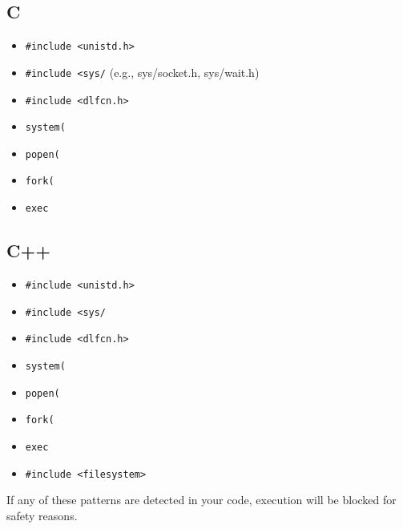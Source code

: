 \documentclass{article}
\begin{document}
\subsection*{C}
\begin{itemize}
    \item \texttt{\#include <unistd.h>}
    \item \texttt{\#include <sys/} (e.g., sys/socket.h, sys/wait.h)
    \item \texttt{\#include <dlfcn.h>}
    \item \texttt{system(}
    \item \texttt{popen(}
    \item \texttt{fork(}
    \item \texttt{exec}
\end{itemize}

\subsection*{C++}
\begin{itemize}
    \item \texttt{\#include <unistd.h>}
    \item \texttt{\#include <sys/}
    \item \texttt{\#include <dlfcn.h>}
    \item \texttt{system(}
    \item \texttt{popen(}
    \item \texttt{fork(}
    \item \texttt{exec}
    \item \texttt{\#include <filesystem>}
\end{itemize}

If any of these patterns are detected in your code, execution will be blocked for safety reasons.
\end{document}
